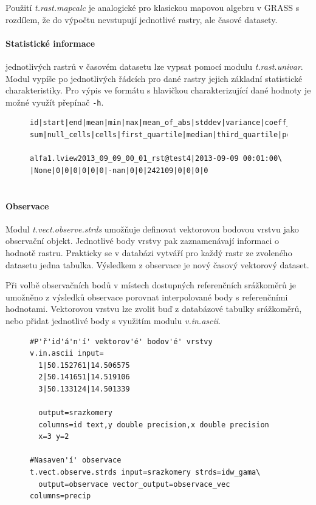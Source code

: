 \documentclass[a4paper,12pt,oneside]{report}
\begin{document}
Použití \textit{t.rast.mapcalc} je analogické pro klasickou mapovou
algebru v GRASS s rozdílem, že do výpočtu nevstupují jednotlivé
rastry, ale časové datasety.



\paragraph{Statistické informace } jednotlivých rastrů v časovém
datasetu lze vypsat pomocí modulu \textit{t.rast.univar}. Modul vypíše
po jednotlivých řádcích pro dané rastry jejich základní statistické
charakteristiky. Pro výpis ve formátu s hlavičkou charakterizující
dané hodnoty je možné využít přepínač \texttt{-h}.

\begin{figure}[h!]
\begin{footnotesize}
\lstset{extendedchars=false,
escapeinside=''}
\begin{lstlisting}[style=mybash]
id|start|end|mean|min|max|mean_of_abs|stddev|variance|coeff_var|\
sum|null_cells|cells|first_quartile|median|third_quartile|percentil

alfa1.lview2013_09_09_00_01_rst@test4|2013-09-09 00:01:00\
|None|0|0|0|0|0|0|-nan|0|0|242109|0|0|0|0
    
\end{lstlisting}
\end{footnotesize} 
\end{figure}


\paragraph{Observace}
Modul \textit{t.vect.observe.strds} umožňuje definovat vektorovou
bodovou vrstvu jako observační objekt. Jednotlivé body vrstvy pak
zaznamenávají informaci o hodnotě rastru. Prakticky se v databázi
vytváří pro každý rastr ze zvoleného datasetu jedna tabulka. Výsledkem
z observace je nový časový vektorový dataset.

Při volbě observačních bodů v místech dostupných referenčních
srážkoměrů je umožněno z výsledků observace porovnat interpolované body s
referenčními hodnotami. Vektorovou vrstvu lze zvolit buď z databázové tabulky srážkoměrů, nebo
přidat jednotlivé body s využitím modulu \textit{v.in.ascii}.
\begin{figure}[h!]
\begin{footnotesize}
\lstset{extendedchars=false,
escapeinside=''}
\begin{lstlisting}[style=mybash]
#P'ř'id'á'n'í' vektorov'é' bodov'é' vrstvy
v.in.ascii input=
  1|50.152761|14.506575
  2|50.141651|14.519106
  3|50.133124|14.501339
  
  output=srazkomery 
  columns=id text,y double precision,x double precision 
  x=3 y=2
  
#Nasaven'í' observace  
t.vect.observe.strds input=srazkomery strds=idw_gama\
  output=observace vector_output=observace_vec columns=precip
  
\end{lstlisting}
\end{footnotesize} 
\end{figure}
\end{document}
